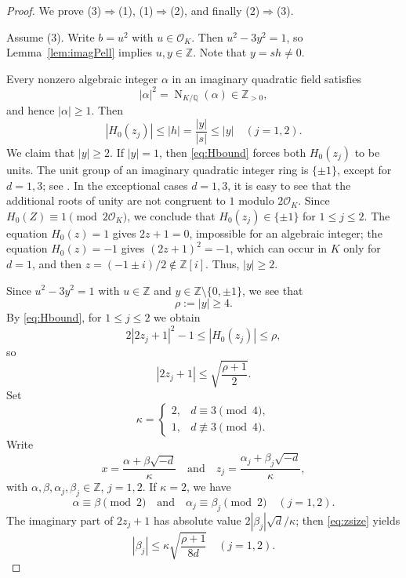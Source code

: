\documentclass[12pt]{amsart}
\numberwithin{equation}{section}
\theoremstyle{remark}
\theoremstyle{plain}
\newcommand{\Z}{\mathbb{Z}}
\newcommand{\Q}{\mathbb{Q}}
\newcommand{\sO}{\mathcal{O}}
\newcommand{\Norm}{\operatorname{N}}
\begin{document}
\begin{proof}
We prove \textup{(3)}$\Rightarrow$\textup{(1)}, \textup{(1)}$\Rightarrow$\textup{(2)}, and finally \textup{(2)}$\Rightarrow$\textup{(3)}.

Assume \textup{(3)}. Write $b=u^2$ with $u\in\sO_K$. Then $u^2-3y^2=1$, so Lemma~\ref{lem:imagPell} implies $u,y\in\Z$. Note that $y=sh\neq0$.

Every nonzero algebraic integer $\alpha$ in an imaginary quadratic field satisfies
\[
|\alpha|^2=\Norm_{K/\Q}(\alpha)\in\Z_{>0},
\]
and hence $|\alpha|\geq1$. Then
\begin{equation}\label{eq:Hbound}
|H_0(z_j)|\leq|h|=\frac{|y|}{|s|}\leq|y|\quad(j=1,2).
\end{equation}
We claim that $|y|\geq2$. If $|y|=1$, then \eqref{eq:Hbound} forces both $H_0(z_j)$ to be units. The unit group of an imaginary quadratic integer ring is $\{\pm1\}$, except for $d=1,3$; see \cite[Proposition~5.8]{Kha22}. In the exceptional cases $d=1,3$, it is easy to see that the additional roots of unity are not congruent to $1$ modulo $2\sO_K$. Since $H_0(Z)\equiv1\pmod{2\sO_K}$, we conclude that $H_0(z_j)\in\{\pm1\}$ for $1\leq j\leq 2$. The equation $H_0(z)=1$ gives $2z+1=0$, impossible for an algebraic integer; the equation $H_0(z)=-1$ gives $(2z+1)^2=-1$, which can occur in $K$ only for $d=1$, and then $z=(-1\pm i)/2\notin\Z[i]$. Thus, $|y|\geq2$.

Since $u^2-3y^2=1$ with $u\in\Z$ and $y\in\Z\setminus\{0,\pm1\}$, we see that
\[
\rho:=|y|\geq4.
\]
By \eqref{eq:Hbound}, for $1\leq j\leq2$ we obtain
\[
2|2z_j+1|^2-1\leq|H_0(z_j)|\leq\rho,
\]
so
\begin{equation}\label{eq:zsize}
|2z_j+1|\leq\sqrt{\frac{\rho+1}{2}}.
\end{equation}
Set
\[
\kappa=
\begin{cases}
2,&d\equiv3\pmod{4},\\
1,&d\not\equiv3\pmod{4}.
\end{cases}
\]
Write
\[
x=\frac{\alpha+\beta\sqrt{-d}}{\kappa}\quad\text{and}\quad z_j=\frac{\alpha_j+\beta_j\sqrt{-d}}{\kappa},
\]
with $\alpha,\beta,\alpha_j,\beta_j\in\Z$, $j=1,2$. If $\kappa=2$, we have
\[
\alpha\equiv\beta\pmod{2}\quad\text{and}\quad\alpha_j\equiv\beta_j\pmod{2}\quad(j=1,2).
\]
The imaginary part of $2z_j+1$ has absolute value $2|\beta_j|\sqrt{d}/\kappa$; then \eqref{eq:zsize} yields
\begin{equation}\label{eq:bjbound}
|\beta_j|\leq\kappa\sqrt{\frac{\rho+1}{8d}}\quad(j=1,2).
\end{equation}


\end{proof}
\end{document}

